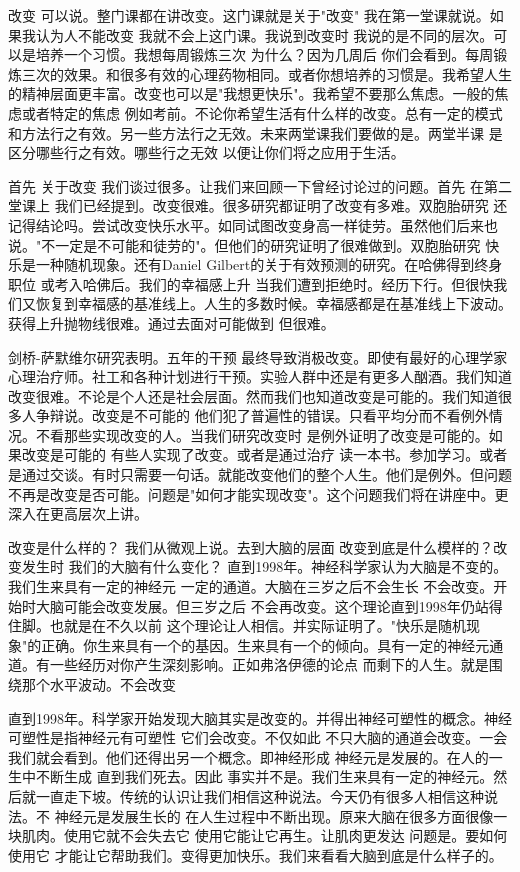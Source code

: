 改变 可以说。整门课都在讲改变。这门课就是关于"改变" 我在第一堂课就说。如果我认为人不能改变 我就不会上这门课。我说到改变时 我说的是不同的层次。可以是培养一个习惯。我想每周锻炼三次 为什么？因为几周后 你们会看到。每周锻炼三次的效果。和很多有效的心理药物相同。或者你想培养的习惯是。我希望人生的精神层面更丰富。改变也可以是"我想更快乐"。我希望不要那么焦虑。一般的焦虑或者特定的焦虑 例如考前。不论你希望生活有什么样的改变。总有一定的模式和方法行之有效。另一些方法行之无效。未来两堂课我们要做的是。两堂半课 是区分哪些行之有效。哪些行之无效 以便让你们将之应用于生活。 

首先 关于改变 我们谈过很多。让我们来回顾一下曾经讨论过的问题。首先 在第二堂课上 我们已经提到。改变很难。很多研究都证明了改变有多难。双胞胎研究 还记得结论吗。尝试改变快乐水平。如同试图改变身高一样徒劳。虽然他们后来也说。"不一定是不可能和徒劳的"。但他们的研究证明了很难做到。双胞胎研究 快乐是一种随机现象。还有Daniel Gilbert的关于有效预测的研究。在哈佛得到终身职位 或考入哈佛后。我们的幸福感上升 当我们遭到拒绝时。经历下行。但很快我们又恢复到幸福感的基准线上。人生的多数时候。幸福感都是在基准线上下波动。获得上升抛物线很难。通过去面对可能做到 但很难。 

剑桥-萨默维尔研究表明。五年的干预 最终导致消极改变。即使有最好的心理学家 心理治疗师。社工和各种计划进行干预。实验人群中还是有更多人酗酒。我们知道改变很难。不论是个人还是社会层面。然而我们也知道改变是可能的。我们知道很多人争辩说。改变是不可能的 他们犯了普遍性的错误。只看平均分而不看例外情况。不看那些实现改变的人。当我们研究改变时 是例外证明了改变是可能的。如果改变是可能的 有些人实现了改变。或者是通过治疗 读一本书。参加学习。或者是通过交谈。有时只需要一句话。就能改变他们的整个人生。他们是例外。但问题不再是改变是否可能。问题是"如何才能实现改变"。这个问题我们将在讲座中。更深入在更高层次上讲。 

改变是什么样的？ 我们从微观上说。去到大脑的层面 改变到底是什么模样的？改变发生时 我们的大脑有什么变化？ 直到1998年。神经科学家认为大脑是不变的。我们生来具有一定的神经元 一定的通道。大脑在三岁之后不会生长 不会改变。开始时大脑可能会改变发展。但三岁之后 不会再改变。这个理论直到1998年仍站得住脚。也就是在不久以前 这个理论让人相信。并实际证明了。"快乐是随机现象"的正确。你生来具有一个的基因。生来具有一个的倾向。具有一定的神经元通道。有一些经历对你产生深刻影响。正如弗洛伊德的论点 而剩下的人生。就是围绕那个水平波动。不会改变 

直到1998年。科学家开始发现大脑其实是改变的。并得出神经可塑性的概念。神经可塑性是指神经元有可塑性 它们会改变。不仅如此 不只大脑的通道会改变。一会我们就会看到。他们还得出另一个概念。即神经形成 神经元是发展的。在人的一生中不断生成 直到我们死去。因此 事实并不是。我们生来具有一定的神经元。然后就一直走下坡。传统的认识让我们相信这种说法。今天仍有很多人相信这种说法。不 神经元是发展生长的 在人生过程中不断出现。原来大脑在很多方面很像一块肌肉。使用它就不会失去它 使用它能让它再生。让肌肉更发达 问题是。要如何使用它 才能让它帮助我们。变得更加快乐。我们来看看大脑到底是什么样子的。 

